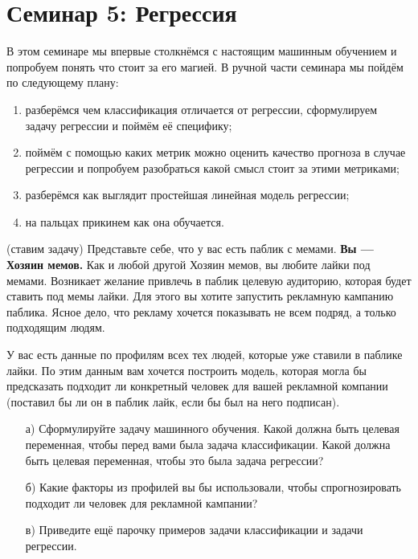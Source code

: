 \documentclass[12pt, a4paper, oneside]{article}
\theoremstyle{plain} %
\theoremstyle{definition}
\newcommand{\indef}[1]{\textbf{ \color{green} #1}}
\begin{document}

\toggletrue{lecture}

\section*{Семинар 5: Регрессия}

В этом семинаре мы впервые столкнёмся с настоящим машинным обучением и попробуем понять что стоит за его магией. В ручной части семинара мы пойдём по следующему  плану: 

\begin{enumerate}
\item разберёмся чем классификация отличается от регрессии, сформулируем задачу регрессии и поймём её специфику;
\item поймём с помощью каких метрик можно оценить качество прогноза в случае регрессии и попробуем разобраться какой смысл стоит за этими метриками;
\item разберёмся как выглядит простейшая линейная модель регрессии;
\item на пальцах прикинем как она обучается.
\end{enumerate}

\begin{problem}{(ставим задачу)}
Представьте себе, что у вас есть паблик с мемами. \indef{Вы --- Хозяин мемов.} Как и любой другой Хозяин мемов, вы любите лайки под мемами. Возникает желание привлечь в паблик целевую аудиторию, которая будет ставить под мемы лайки. Для этого вы хотите запустить рекламную кампанию паблика. Ясное дело, что рекламу хочется показывать не всем подряд,  а только подходящим людям. 

У вас есть данные по профилям всех тех людей, которые уже ставили в паблике лайки. По этим данным вам хочется построить модель, которая могла бы предсказать подходит ли конкретный человек для вашей рекламной компании (поставил бы ли он в паблик лайк, если бы был на него подписан). 

\begin{enumerate}
\item[а)] Сформулируйте задачу машинного обучения. Какой должна быть целевая переменная, чтобы перед вами была задача классификации. Какой должна быть целевая переменная, чтобы это была задача регрессии? 

\item[б)] Какие факторы из профилей вы бы использовали, чтобы спрогнозировать подходит ли человек для рекламной кампании?

\item[в)] Приведите ещё парочку примеров задачи классификации и задачи регрессии. 
\end{enumerate}
\end{problem}
\end{document}
